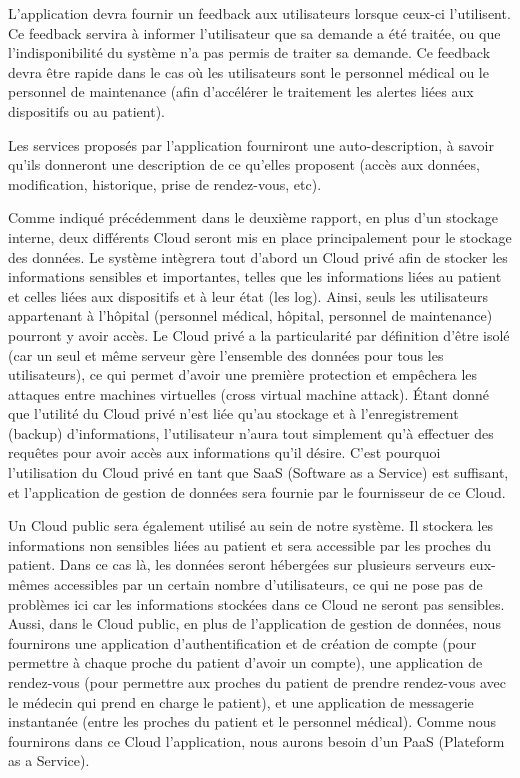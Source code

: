 L’application devra fournir un feedback aux utilisateurs lorsque ceux-ci l'utilisent. Ce feedback servira à informer l’utilisateur que sa demande a été traitée, ou que l’indisponibilité du système n’a pas permis de traiter sa demande. Ce feedback devra être rapide dans le cas où les utilisateurs sont le personnel médical ou le personnel de maintenance (afin d'accélérer le traitement les alertes liées aux dispositifs ou au patient).

Les services proposés par l'application fourniront une auto-description, à savoir qu'ils donneront une description de ce qu'elles proposent (accès aux données, modification, historique, prise de rendez-vous, etc).

Comme indiqué précédemment dans le deuxième rapport, en plus d'un stockage interne, deux différents Cloud seront mis en place principalement pour le stockage des données. Le système intègrera tout d'abord un Cloud privé afin de stocker les informations sensibles et importantes, telles que les informations liées au patient et celles liées aux dispositifs et à leur état (les log). Ainsi, seuls les utilisateurs appartenant à l’hôpital (personnel médical, hôpital, personnel de maintenance) pourront y avoir accès. Le Cloud privé a la particularité par définition d'être isolé (car un seul et même serveur gère l’ensemble des données pour tous les utilisateurs), ce qui permet d'avoir une première protection et empêchera les attaques entre machines virtuelles (cross virtual machine attack). Étant donné que l'utilité du Cloud privé n'est liée qu'au stockage et à l'enregistrement (backup) d'informations, l'utilisateur n'aura tout simplement qu'à effectuer des requêtes pour avoir accès aux informations qu'il désire. C'est pourquoi l'utilisation du Cloud privé en tant que SaaS (Software as a Service) est suffisant, et l'application de gestion de données sera fournie par le fournisseur de ce Cloud.

Un Cloud public sera également utilisé au sein de notre système. Il stockera les informations non sensibles liées au patient et sera accessible par les proches du patient. Dans ce cas là, les données seront hébergées sur plusieurs serveurs eux-mêmes accessibles par un certain nombre d’utilisateurs, ce qui ne pose pas de problèmes ici car les informations stockées dans ce Cloud ne seront pas sensibles. Aussi, dans le Cloud public, en plus de l'application de gestion de données, nous fournirons une application d'authentification et de création de compte (pour permettre à chaque proche du patient d'avoir un compte), une application de rendez-vous (pour permettre aux proches du patient de prendre rendez-vous avec le médecin qui prend en charge le patient), et une application de messagerie instantanée (entre les proches du patient et le personnel médical). Comme nous fournirons dans ce Cloud l'application, nous aurons besoin d'un PaaS (Plateform as a Service).

